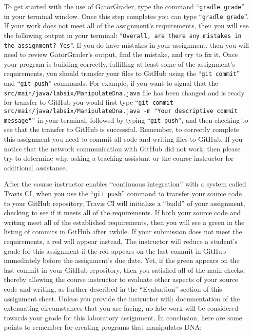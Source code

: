 \documentclass[11pt]{article}
\newcommand{\mainprogramsource}{\lstinline{src/main/java/labsix/ManipulateDna.java}}
\newcommand{\gatorgraderstart}{\command{gradle grade}}
\newcommand{\gatorgradercheck}{\command{gradle grade}}
\newcommand{\gitcommit}{\command{git commit}}
\newcommand{\gitpush}{\command{git push}}
\newcommand{\gitcommitmainprogram}{\command{git commit src/main/java/labsix/ManipulateDna.java -m "Your
descriptive commit message"}}
\newcommand{\command}[1]{``\lstinline{#1}''}
\newcommand{\step}[1]{``{#1}''}
\newcommand{\checkmark}{\ding{51}}
\newcommand{\naughtmark}{\ding{55}}
\begin{document}
To get started with the use of GatorGrader, type the command \gatorgraderstart{} in your terminal window. Once this step
completes you can type \gatorgradercheck{}. If your work does not meet all of the assignment's requirements, then you
will see the following output in your terminal: \command{Overall, are there any mistakes in the assignment? Yes}. If you
do have mistakes in your assignment, then you will need to review GatorGrader's output, find the mistake, and try to fix
it. Once your program is building correctly, fulfilling at least some of the assignment's requirements, you should
transfer your files to GitHub using the \gitcommit{} and \gitpush{} commands. For example, if you want to signal that
the \mainprogramsource{} file has been changed and is ready for transfer to GitHub you would first type
\gitcommitmainprogram{} in your terminal, followed by typing \gitpush{}, and then checking to see that the transfer to
GitHub is successful. Remember, to correctly complete this assignment you need to commit all code and writing files to
GitHub. If you notice that the network communication with GitHub did not work, then please try to determine why, asking
a teaching assistant or the course instructor for additional assistance.

After the course instructor enables \step{continuous integration} with a system called Travis CI, when you use the
\gitpush{} command to transfer your source code to your GitHub repository, Travis CI will initialize a \step{build} of
your assignment, checking to see if it meets all of the requirements. If both your source code and writing meet all of
the established requirements, then you will see a green \checkmark{} in the listing of commits in GitHub after awhile.
If your submission does not meet the requirements, a red \naughtmark{} will appear instead. The instructor will reduce a
student's grade for this assignment if the red \naughtmark{} appears on the last commit in GitHub immediately before the
assignment's due date. Yet, if the green \checkmark{} appears on the last commit in your GitHub repository, then you
satisfied all of the main checks, thereby allowing the course instructor to evaluate other aspects of your source code
and writing, as further described in the \step{Evaluation} section of this assignment sheet. Unless you provide the
instructor with documentation of the extenuating circumstances that you are facing, no late work will be considered
towards your grade for this laboratory assignment. In conclusion, here are some points to remember for creating programs
that manipulates DNA:
\end{document}
